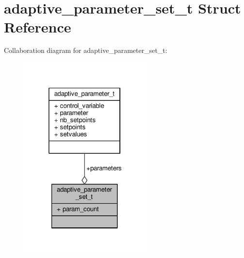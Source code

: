 \hypertarget{structadaptive__parameter__set__t}{\section{adaptive\+\_\+parameter\+\_\+set\+\_\+t Struct Reference}
\label{structadaptive__parameter__set__t}
}


Collaboration diagram for adaptive\+\_\+parameter\+\_\+set\+\_\+t\+:
\nopagebreak
\begin{figure}[H]
\begin{center}
\leavevmode
\includegraphics[width=193pt]{structadaptive__parameter__set__t__coll__graph}
\end{center}
\end{figure}
